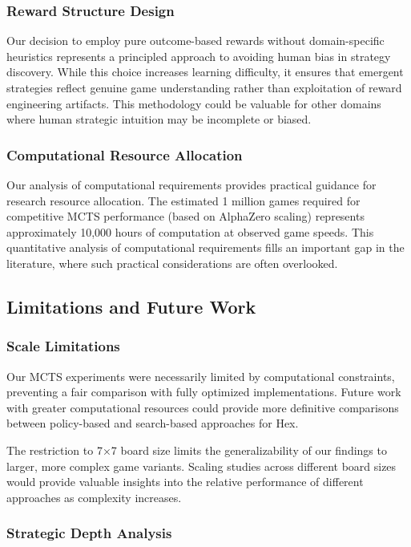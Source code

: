 \documentclass[conference]{IEEEtran}
\begin{document}
\subsubsection{Reward Structure Design}

Our decision to employ pure outcome-based rewards without domain-specific heuristics represents a principled approach to avoiding human bias in strategy discovery. While this choice increases learning difficulty, it ensures that emergent strategies reflect genuine game understanding rather than exploitation of reward engineering artifacts. This methodology could be valuable for other domains where human strategic intuition may be incomplete or biased.

\subsubsection{Computational Resource Allocation}

Our analysis of computational requirements provides practical guidance for research resource allocation. The estimated 1 million games required for competitive MCTS performance (based on AlphaZero scaling) represents approximately 10,000 hours of computation at observed game speeds. This quantitative analysis of computational requirements fills an important gap in the literature, where such practical considerations are often overlooked.

\subsection{Limitations and Future Work}

\subsubsection{Scale Limitations}

Our MCTS experiments were necessarily limited by computational constraints, preventing a fair comparison with fully optimized implementations. Future work with greater computational resources could provide more definitive comparisons between policy-based and search-based approaches for Hex.

The restriction to 7×7 board size limits the generalizability of our findings to larger, more complex game variants. Scaling studies across different board sizes would provide valuable insights into the relative performance of different approaches as complexity increases.

\subsubsection{Strategic Depth Analysis}
\end{document}

